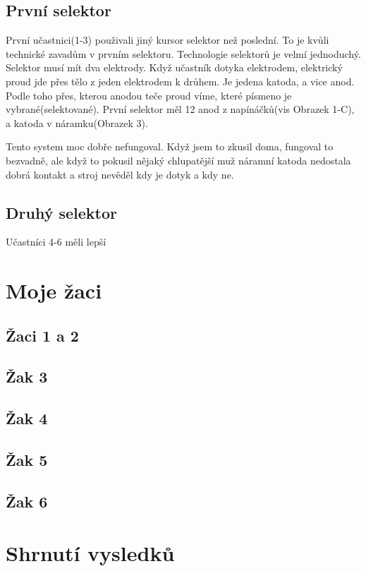 \subsection{První selektor}

První učastnici(1-3) použivali jiný kursor selektor než poslední.  To je kvůli technické zavadům v prvním selektoru.   Technologie selektorů je velmí jednoduchý.  Selektor musí mít dva elektrody.  Když učastník dotyka elektrodem, elektrický proud jde přes tělo z jeden elektrodem k drůhem.  Je jedena katoda, a vice anod.  Podle toho přes, kterou anodou teče proud víme, které písmeno je vybrané(selektované).   První selektor měl 12 anod z napínáčků(vis Obrazek 1-C), a katoda v náramku(Obrazek 3).

Tento system moc dobře nefungoval. Když jsem to zkusil doma, fungoval to bezvadně, ale když to pokusil nějaký chlupatější muž náramní katoda nedostala dobrá kontakt a stroj nevěděl kdy je dotyk a kdy ne.

\subsection{Druhý selektor}

Učastníci 4-6 měli lepší

\section{Moje žaci}

\subsection{Žaci 1 a 2}

\subsection{Žak 3}

\subsection{Žak 4}

\subsection{Žak 5}

\subsection{Žak 6}

\section{Shrnutí vysledků}
